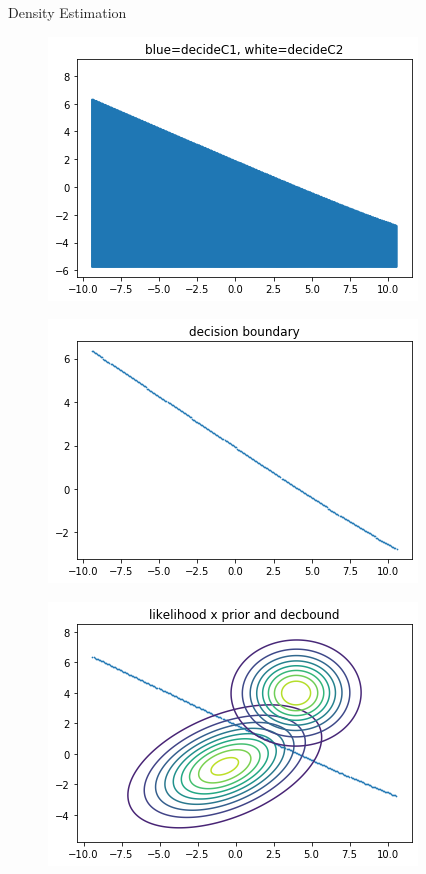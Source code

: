\documentclass[
ngerman,
]{tudaexercise}
\begin{document}
\begin{task}{Density Estimation}
\begin{subtask}
\begin{figure}[H]
\end{figure}
\begin{figure}[H]
	\includegraphics{dec1.png}
\end{figure}
\begin{figure}[H]
	\includegraphics{dec2.png}
\end{figure}
\begin{figure}[H]
	\includegraphics{dec3.png}
\end{figure}
	\end{subtask}
	\end{task}
\end{document}
